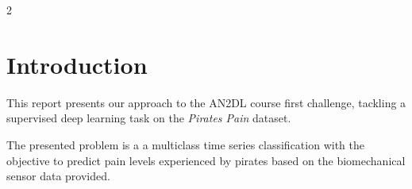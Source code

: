\documentclass[11pt]{article}
\begin{document}
    \begin{multicols}{2}
    
        \section{Introduction}
        
        
        This report presents our approach to the AN2DL course first challenge, tackling a supervised deep learning task on the \textit{Pirates Pain} dataset. 
        
        The presented problem is a a multiclass time series classification with the objective to predict pain levels experienced by pirates based on the biomechanical sensor data provided. 
       
                
                
                    
        
            

\end{multicols}
\end{document}

